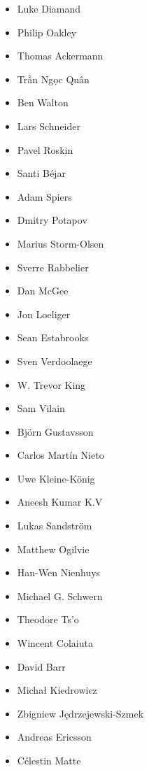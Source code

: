 \begin{frame}
{\begin{multicols}{7}
\begin{itemize}
                \item[] Luke Diamand
                \item[] Philip Oakley
                \item[] Thomas Ackermann
                \item[] Trần Ngọc Quân
                \item[] Ben Walton
                \item[] Lars Schneider
                \item[] Pavel Roskin
                \item[] Santi Béjar
                \item[] Adam Spiers
                \item[] Dmitry Potapov
                \item[] Marius Storm-Olsen
                \item[] Sverre Rabbelier
                \item[] Dan McGee
                \item[] Jon Loeliger
                \item[] Sean Estabrooks
                \item[] Sven Verdoolaege
                \item[] W. Trevor King
                \item[] Sam Vilain
                \item[] Björn Gustavsson
                \item[] Carlos Martín Nieto
                \item[] Uwe Kleine-König
                \item[] Aneesh Kumar K.V
                \item[] Lukas Sandström
                \item[] Matthew Ogilvie
                \item[] Han-Wen Nienhuys
                \item[] Michael G. Schwern
                \item[] Theodore Ts'o
                \item[] Wincent Colaiuta
                \item[] David Barr
                \item[] Michał Kiedrowicz
                \item[] Zbigniew Jędrzejewski-Szmek
                \item[] Andreas Ericsson
                \item[] Célestin Matte

\end{itemize}
\end{multicols}}
\end{frame}
